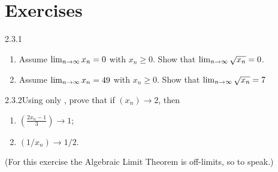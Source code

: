 \section*{Exercises}

\begin{exercise}
    {2.3.1}
    \begin{enumerate}
        \item Assume \(\lim_{n \rightarrow \infty}x_n = 0\) with \(x_n \geq 0\). Show that \(\lim_{n \rightarrow \infty}\sqrt{x_n} = 0\).
        \item Assume \(\lim_{n \rightarrow \infty}x_n = 49\) with \(x_n \geq 0\). Show that \(\lim_{n \rightarrow \infty}\sqrt{x_n} = 7\)
    \end{enumerate}
\end{exercise}


\begin{exercise}
    {2.3.2}Using only , prove that if $(x_n) \rightarrow 2$, then
    \begin{enumerate}
        \item $\displaystyle \left(\frac{2x_n - 1}{3}\right) \rightarrow 1$;
        \item $\displaystyle \left(1 / x_n\right) \rightarrow 1 / 2$.
    \end{enumerate}
    (For this exercise the Algebraic Limit Theorem is off-limits, so to speak.)
\end{exercise}


